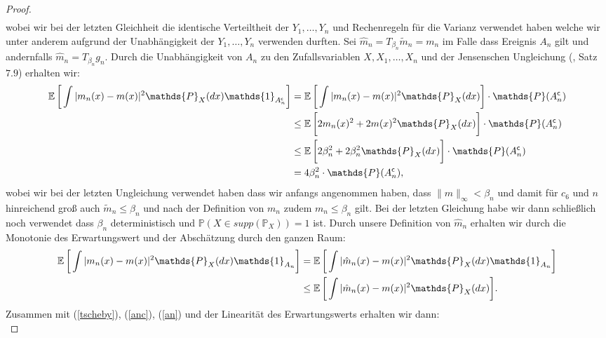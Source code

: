 \begin{proof}
\begin{equation}
\begin{split}
\end{split}
\end{equation}
wobei wir bei der letzten Gleichheit die identische Verteiltheit der $Y_1,\dots,Y_n$ und Rechenregeln für die Varianz verwendet haben welche wir unter anderem aufgrund der Unabhängigkeit der $Y_1,\dots,Y_n$ verwenden durften.
Sei $\hat{m}_n = T_{\beta_n}\tilde{m}_n = m_n$ im Falle dass Ereignis $A_n$ gilt und andernfalls $\hat{m}_n = T_{\beta_n}g_n$. Durch die Unabhängigkeit von $A_n$ zu den Zufallsvariablen $X, X_1, \dots, X_n$ und der Jensenschen Ungleichung (\cite{Klenke2013}, Satz $7.9$) erhalten wir:
\begin{equation}
\label{anc}
\begin{split}
 \E \bigg[\int |m_n(x) - m(x)|^2 \mathds{P}_X(dx) \mathds{1}_{A_n^{\mathsf{c}}}\bigg] & =  \E \bigg[\int |m_n(x) - m(x)|^2 \mathds{P}_X(dx) \bigg] \cdot \mathds{P}(A_n^{\mathsf{c}}) \\
 & \leq \E \bigg[2m_n(x)^2 + 2m(x)^2 \mathds{P}_X(dx)\bigg] \cdot \mathds{P}(A_n^{\mathsf{c}})\\
 & \leq \E \bigg[2\beta_n^2 + 2\beta_n^2 \mathds{P}_X(dx)\bigg] \cdot \mathds{P}(A_n^{\mathsf{c}})\\
 & = 4\beta_n^2 \cdot \mathds{P}(A_n^{\mathsf{c}}),
\end{split}
\end{equation}
wobei wir bei der letzten Ungleichung verwendet haben dass wir anfangs angenommen haben, dass $\|m\|_{\infty} < \beta_n$ und damit für $c_6$ und $n$ hinreichend groß auch $\tilde{m}_n \leq \beta_n$ und nach der Definition von $m_n$ zudem $m_n \leq \beta_n$ gilt. Bei der letzten Gleichung habe wir dann schließlich noch verwendet dass $\beta_n$ deterministisch und $\mathds{P}(X \in supp(\mathds{P}_X)) = 1$ ist.
Durch unsere Definition von $\hat{m}_n$ erhalten wir durch die Monotonie des Erwartungswert und der Abschätzung durch den ganzen Raum:
\begin{equation}
\label{an}
\begin{split}
\E \bigg[\int |m_n(x) - m(x)|^2 \mathds{P}_X(dx) \mathds{1}_{A_n}\bigg] & = \E \bigg[\int |\hat{m}_n(x) - m(x)|^2 \mathds{P}_X(dx) \mathds{1}_{A_n}\bigg] \\
& \leq \E \bigg[\int |\hat{m}_n(x) - m(x)|^2 \mathds{P}_X(dx)\bigg].
\end{split}
\end{equation}
Zusammen mit (\ref{tscheby}), (\ref{anc}), (\ref{an}) und der Linearität des Erwartungswerts erhalten wir dann:
\begin{equation}

\end{equation}
\end{proof}
